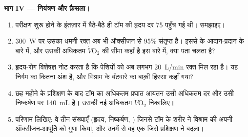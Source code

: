 \begin{problem}
\medskip
\noindent\textbf{भाग IV --- नियंत्रण और फ़ैसला।}
\begin{enumerate}[resume]
  \item परीक्षण शुरू होने के इंतज़ार में बैठे-बैठे ही टॉम की हृदय दर 75
        पहुँच गई थी। समझाइए।
  \item \qty{300}{W} पर उसका धमनी रक्त अब भी ऑक्सीजन से 95\% संतृप्त
        है। इससे  के आदान-प्रदान के बारे में, और उसकी अधिकतम
        $\dot V\!\mathrm{O_2}$ की सीमा कहाँ है इस बारे में, क्या पता
        चलता है?
  \item हृदय-रोग विशेषज्ञ नोट करता है कि पेशियों को अब लगभग
        \qty{20}{L/min} रक्त मिल रहा है। यह निर्गम का कितना अंश है, और
        विश्राम के बँटवारे का बाक़ी हिस्सा कहाँ गया?
  \item छह महीने के प्रशिक्षण के बाद टॉम का अधिकतम प्रघात आयतन उसी
        अधिकतम दर और उसी निष्कर्षण पर \qty{140}{mL} है। उसकी नई अधिकतम
        $\dot V\!\mathrm{O_2}$ निकालिए।
  \item परिणाम लिखिए: वे तीन संख्याएँ (हृदय, निष्कर्षण, ) जिनसे
        टॉम के शरीर ने विश्राम की अपनी ऑक्सीजन-आपूर्ति को गुणा किया, और
        उनमें से वह एक जिसे प्रशिक्षण ने बदला।
\end{enumerate}
\end{problem}

